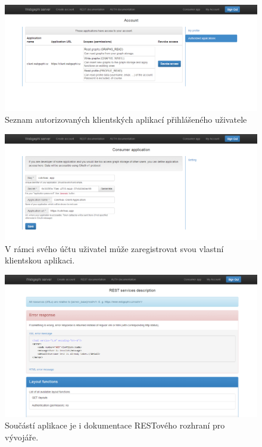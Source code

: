 \documentclass[thesis=M,czech]{FITthesis}[2014/05/6]
\begin{document}
\begin{figure}\centering
 	\includegraphics[width=1\textwidth]{images/prtsc/server-04-authorized_apps}
 	\caption[Autorizované aplikace uživatele]{Seznam autorizovaných klientských aplikací přihlášeného uživatele}\label{fig:server-04-authorized_apps}
\end{figure}
\begin{figure}\centering
 	\includegraphics[width=1\textwidth]{images/prtsc/server-05-consumer_app_settings}
 	\caption[Nastavení klientské aplikace]{V rámci svého účtu uživatel může zaregistrovat svou vlastní klientskou aplikaci.}\label{fig:server-05-consumer_app_settings}
\end{figure}
\begin{figure}\centering
 	\includegraphics[width=1\textwidth]{images/prtsc/server-06-docs_rest}
 	\caption[REST dokumentace]{Součástí aplikace je i dokumentace RESTového rozhraní pro vývojáře.}\label{fig:server-06-docs_rest}
\end{figure}
\end{document}
